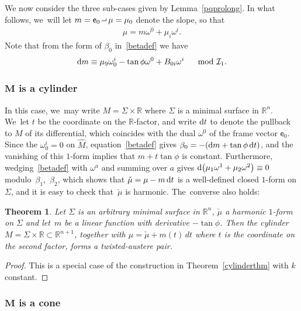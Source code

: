 \documentclass[10pt,a4paper]{amsart}
\def\R{\mathbb{R}}
\def\ve{\mathsf{e}}
\def\mudown{\check{\mu}}
\def\I{\mathcal{I}}
\def\w{\omega}
\def\Mhat{\widehat{M}}
\newcommand{\intprod}{\mathbin{\raisebox{.4ex}{\hbox{\vrule height .5pt width 5pt depth 0pt \vrule height 3pt width .5pt depth 0pt}}}}
\newtheorem{Theorem}{Theorem}[section]
\numberwithin{equation}{section}
\begin{document}
We now consider the three sub-cases given by Lemma~\ref{pqprolong}. In what follows, we~will let $m = \ve_0 \intprod \mu = \mu_0$ denote the slope, so that
\begin{gather*}
\mu = m \w^0 + \mu_i \w^i.
\end{gather*}
Note that from the form of $\beta_0$ in~\eqref{betadef} we have
\begin{gather*}
{\rm d}m \equiv \mu_9 \w^i_0 - \tan \phi \w^0 + B_{0i} \w^i \quad \mod \I_1.
\end{gather*}

\subsubsection[M is a cylinder]
{$\boldsymbol M$ is a cylinder} \label{splitcylindersec}

In this case, we~may write $M = \Sigma \times \R$ where $\Sigma$ is a minimal surface in $\R^n$. We~let $t$ be the coordinate on the $\R$-factor, and write ${\rm d}t$ to denote the pullback to $M$ of its differential, which coincides with the dual $\w^0$ of the frame vector $\ve_0$. Since the $\w^i_0=0$ on $\Mhat$, equation~\eqref{betadef} gives $\beta_0 = -({\rm d}m + \tan \phi\, {\rm d}t)$, and the vanishing of this $1$-form implies that $m+t \tan \phi $ is constant. Furthermore, wedging~\eqref{betadef} with $\w^a$ and summing over $a$ gives ${\rm d}\big(\mu_1 \w^1 + \mu_2 \w^2\big) \equiv 0$ modulo~$\beta_1$,~$\beta_2$, which shows that $\mudown = \mu - m\, {\rm d}t$ is a well-defined closed $1$-form on $\Sigma$, and it is easy to check that~$\mudown$ is harmonic. The~converse also holds:

\begin{Theorem} Let $\Sigma$ is an arbitrary minimal surface in $\R^n$, $\mudown$ a harmonic $1$-form on $\Sigma$ and let~$m$ be a linear function with derivative $-\tan\phi$. Then the cylinder $M = \Sigma \times \R \subset \R^{n+1}$, together with $\mu = \mudown + m(t) \,dt$ where $t$ is the coordinate on the second factor, forms a twisted-austere pair.
\end{Theorem}

\begin{proof} This is a special case of the construction in Theorem~\ref{cylinderthm} with $k$ constant.
\end{proof}

\subsubsection[M is a cone]
{$\boldsymbol M$ is a cone} \label{splitconesec}
\end{document}
